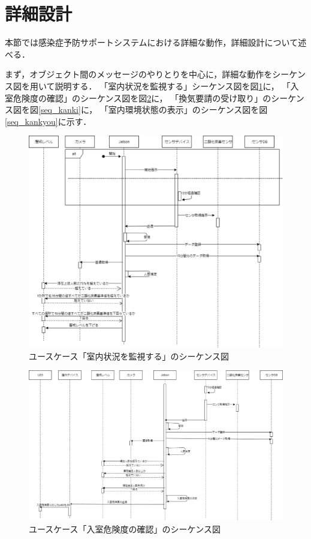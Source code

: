 
\section{詳細設計}

本節では感染症予防サポートシステムにおける詳細な動作，詳細設計について述べる．

まず，オブジェクト間のメッセージのやりとりを中心に，詳細な動作をシーケンス図を用いて説明する．
「室内状況を監視する」シーケンス図を図\ref{seq_kanshi}に，
「入室危険度の確認」のシーケンス図を図\ref{seq_enterlisk}に，
「換気要請の受け取り」のシーケンス図を図\ref{seq_kanki}に，
「室内環境状態の表示」のシーケンス図を図\ref{seq_kankyou}に示す．
\begin{figure}[htbp]
    \centering
    \includegraphics[width = 15cm]{./picture/sequence_kanshi_3.eps}
    \caption{ユースケース「室内状況を監視する」のシーケンス図}
    \label{seq_kanshi}
\end{figure}
\begin{figure}[htbp]
    \centering
    \includegraphics[width = 15cm]{./picture/sequence_nyushitsu_2.eps}
    \caption{ユースケース「入室危険度の確認」のシーケンス図}
    \label{seq_enterlisk}
\end{figure}

